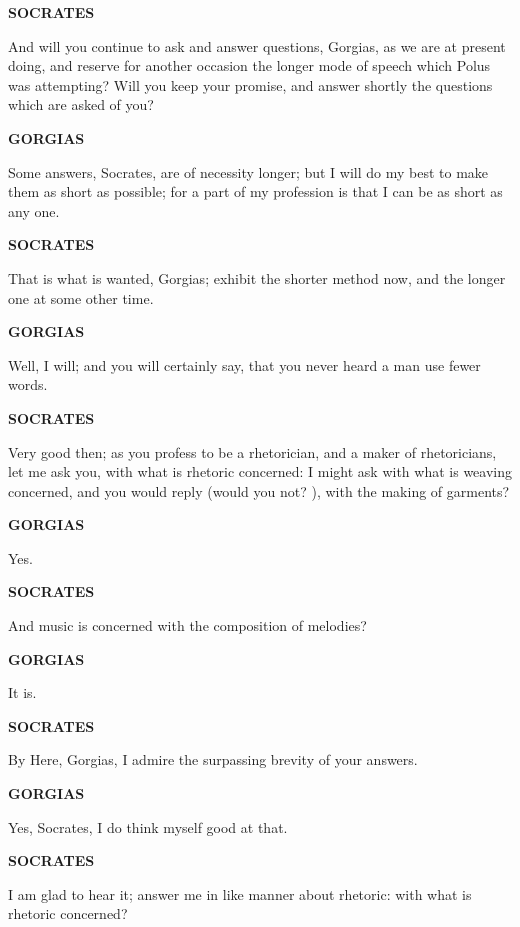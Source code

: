 \documentclass[11pt,letter]{article}
\begin{document}
\par \textbf{SOCRATES}
\par   And will you continue to ask and answer questions, Gorgias, as we are at present doing, and reserve for another occasion the longer mode of speech which Polus was attempting? Will you keep your promise, and answer shortly the questions which are asked of you?

\par \textbf{GORGIAS}
\par   Some answers, Socrates, are of necessity longer; but I will do my best to make them as short as possible; for a part of my profession is that I can be as short as any one.

\par \textbf{SOCRATES}
\par   That is what is wanted, Gorgias; exhibit the shorter method now, and the longer one at some other time.

\par \textbf{GORGIAS}
\par   Well, I will; and you will certainly say, that you never heard a man use fewer words.

\par \textbf{SOCRATES}
\par   Very good then; as you profess to be a rhetorician, and a maker of rhetoricians, let me ask you, with what is rhetoric concerned:  I might ask with what is weaving concerned, and you would reply (would you not? ), with the making of garments?

\par \textbf{GORGIAS}
\par   Yes.

\par \textbf{SOCRATES}
\par   And music is concerned with the composition of melodies?

\par \textbf{GORGIAS}
\par   It is.

\par \textbf{SOCRATES}
\par   By Here, Gorgias, I admire the surpassing brevity of your answers.

\par \textbf{GORGIAS}
\par   Yes, Socrates, I do think myself good at that.

\par \textbf{SOCRATES}
\par   I am glad to hear it; answer me in like manner about rhetoric:  with what is rhetoric concerned?
\end{document}
